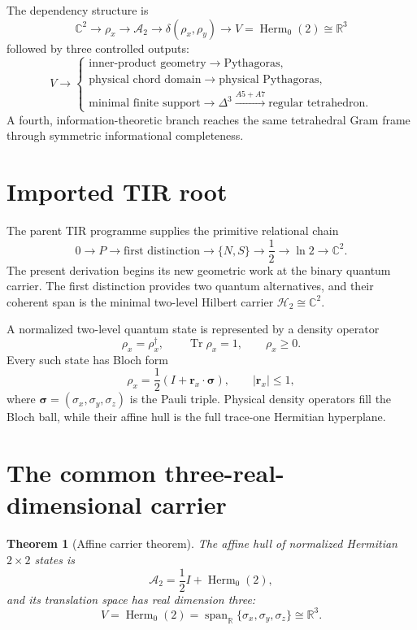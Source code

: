 \documentclass[12pt,a4paper]{article}
\newtheorem{theorem}{Theorem}[section]
\newcommand{\Herm}{\operatorname{Herm}}
\newcommand{\Tr}{\operatorname{Tr}}
\newcommand{\R}{\mathbb{R}}
\newcommand{\C}{\mathbb{C}}
\newcommand{\Astate}{\mathcal{A}_2}
\newcommand{\sigmavec}{\bm{\sigma}}
\newcommand{\rvec}{\bm{r}}
\begin{document}
The dependency structure is
\[
\boxed{
\C^2
\longrightarrow
\rho_x
\longrightarrow
\Astate
\longrightarrow
\delta(\rho_x,\rho_y)
\longrightarrow
V=\Herm_0(2)\cong\R^3
}
\]
followed by three controlled outputs:
\[
\boxed{
V\longrightarrow
\begin{cases}
\text{inner-product geometry}\longrightarrow\text{Pythagoras},\\[1mm]
\text{physical chord domain}\longrightarrow\text{physical Pythagoras},\\[1mm]
\text{minimal finite support}\longrightarrow\Delta^3\xrightarrow{A5+A7}\text{regular tetrahedron}.
\end{cases}}
\]
A fourth, information-theoretic branch reaches the same tetrahedral Gram frame through symmetric informational completeness.

\section{Imported TIR root}

The parent TIR programme supplies the primitive relational chain
\[
0\longrightarrow P\longrightarrow\text{first distinction}\longrightarrow\{N,S\}
\longrightarrow\frac12\longrightarrow\ln 2\longrightarrow\C^2.
\]
The present derivation begins its new geometric work at the binary quantum carrier. The first distinction provides two quantum alternatives, and their coherent span is the minimal two-level Hilbert carrier $\mathcal H_2\cong\C^2$.

A normalized two-level quantum state is represented by a density operator
\[
\rho_x=\rho_x^\dagger,\qquad \Tr\rho_x=1,\qquad \rho_x\ge0.
\]
Every such state has Bloch form \cite{NielsenChuang}
\[
\boxed{
\rho_x=\frac12\left(I+\rvec_x\cdot\sigmavec\right),\qquad |\rvec_x|\le1,
}
\]
where $\sigmavec=(\sigma_x,\sigma_y,\sigma_z)$ is the Pauli triple. Physical density operators fill the Bloch ball, while their affine hull is the full trace-one Hermitian hyperplane.

\section{The common three-real-dimensional carrier}

\begin{theorem}[Affine carrier theorem]\label{thm:carrier}
The affine hull of normalized Hermitian $2\times2$ states is
\[
\Astate=\frac12 I+\Herm_0(2),
\]
and its translation space has real dimension three:
\[
V=\Herm_0(2)=\operatorname{span}_{\R}\{\sigma_x,\sigma_y,\sigma_z\}\cong\R^3.
\]
\end{theorem}
\end{document}
